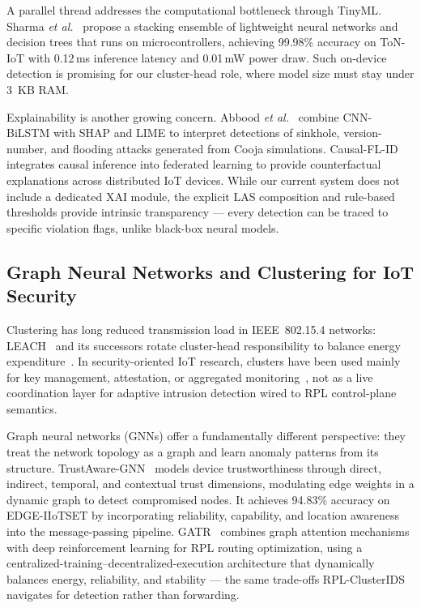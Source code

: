 A parallel thread addresses the computational bottleneck through TinyML.
Sharma \textit{et al.}~\cite{sharma2025tinyml} propose a stacking ensemble of lightweight neural networks and decision trees that runs on microcontrollers, achieving 99.98\% accuracy on ToN-IoT with 0.12\,ms inference latency and 0.01\,mW power draw.
Such on-device detection is promising for our cluster-head role, where model size must stay under 3~KB RAM.

Explainability is another growing concern.
Abbood \textit{et al.}~\cite{xaiids2026} combine CNN-BiLSTM with SHAP and LIME to interpret detections of sinkhole, version-number, and flooding attacks generated from Cooja simulations.
Causal-FL-ID~\cite{causalfl2026} integrates causal inference into federated learning to provide counterfactual explanations across distributed IoT devices.
While our current system does not include a dedicated XAI module, the explicit LAS composition and rule-based thresholds provide intrinsic transparency --- every detection can be traced to specific violation flags, unlike black-box neural models.

\subsection{Graph Neural Networks and Clustering for IoT Security}
Clustering has long reduced transmission load in IEEE~802.15.4 networks: LEACH~\cite{heinzelman2000} and its successors rotate cluster-head responsibility to balance energy expenditure~\cite{heinzelman2002}.
In security-oriented IoT research, clusters have been used mainly for key management, attestation, or aggregated monitoring~\cite{dib2024}, not as a live coordination layer for adaptive intrusion detection wired to RPL control-plane semantics.

Graph neural networks (GNNs) offer a fundamentally different perspective: they treat the network topology as a graph and learn anomaly patterns from its structure.
TrustAware-GNN~\cite{trustawaregnn2025} models device trustworthiness through direct, indirect, temporal, and contextual trust dimensions, modulating edge weights in a dynamic graph to detect compromised nodes. It achieves 94.83\% accuracy on EDGE-IIoTSET by incorporating reliability, capability, and location awareness into the message-passing pipeline.
GATR~\cite{gatr2025} combines graph attention mechanisms with deep reinforcement learning for RPL routing optimization, using a centralized-training--decentralized-execution architecture that dynamically balances energy, reliability, and stability --- the same trade-offs RPL-ClusterIDS navigates for detection rather than forwarding.


